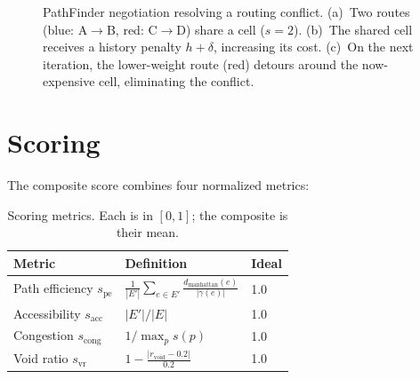 \documentclass[11pt,a4paper]{article}
\begin{document}
\begin{figure}[ht]
\caption{PathFinder negotiation resolving a routing conflict. (a)~Two routes
(blue: A$\to$B, red: C$\to$D) share a cell ($s=2$). (b)~The shared cell
receives a history penalty $h + \delta$, increasing its cost. (c)~On the next
iteration, the lower-weight route (red) detours around the now-expensive cell,
eliminating the conflict.}
\label{fig:pathfinder}
\end{figure}

\section{Scoring}

The composite score combines four normalized metrics:

\begin{table}[h]
\centering
\begin{tabular}{@{}lll@{}}
\toprule
Metric & Definition & Ideal \\
\midrule
Path efficiency $s_\text{pe}$ & $\frac{1}{|E'|}\sum_{e \in E'} \frac{d_\text{manhattan}(e)}{|\gamma(e)|}$ & 1.0 \\[4pt]
Accessibility $s_\text{acc}$ & $|E'| / |E|$ & 1.0 \\[4pt]
Congestion $s_\text{cong}$ & $1 / \max_p s(p)$ & 1.0 \\[4pt]
Void ratio $s_\text{vr}$ & $1 - \frac{|r_\text{void} - 0.2|}{0.2}$ & 1.0 \\
\bottomrule
\end{tabular}
\caption{Scoring metrics. Each is in $[0, 1]$; the composite is their mean.}
\end{table}
\end{document}

